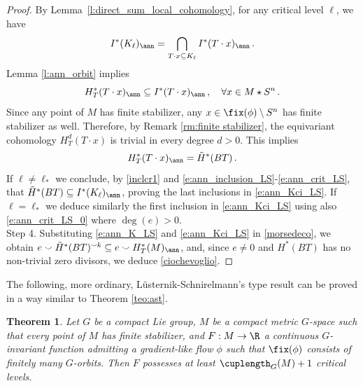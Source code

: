\documentclass[11pt,a4paper,reqno]{article}
\numberwithin{equation}{section}
\newtheorem{theorem}{Theorem}[section]
\theoremstyle{definition}
\begin{document}
\begin{proof}
\noindent
By Lemma~\ref{l:direct_sum_local_cohomology},
for any critical level $ \ell $, we have
\begin{equation}
\label{inclcr1}
I^*(K_\ell)_{\ann} = 
\bigcap_{T\cdot x\subseteq K_\ell}
I^*(T\cdot x)_\ann \,.
\end{equation} 
Lemma \ref{l:ann_orbit} implies 
\begin{equation}
\label{e:ann_inclusion_LS}
H^*_{T}(T\cdot x)_\ann
\subseteq
I^*(T\cdot x)_\ann \, , \quad \forall x \in M \star  S^n   \, .
\end{equation}
Since any point of $M$ has finite stabilizer,  any $x\in\fix(\phi)\setminus S^n$ has finite stabilizer as well. Therefore, by Remark \ref{rm:finite stabilizer},   the equivariant cohomology $H^d_T(T\cdot x)$ is trivial in every degree $d>0$. This implies  
\begin{equation}
\label{e:ann_crit_LS}
H^*_T(T\cdot x)_\ann
=
\tilde H^*(BT) \, . 
\end{equation}
If $ \ell \neq \ell_* $
we conclude, 
by \eqref{inclcr1} and   
\eqref{e:ann_inclusion_LS}-\eqref{e:ann_crit_LS},  that 
$ \tilde H^*(BT)\subseteq I^*(K_{\ell})_\ann $, 
proving  the last inclusions in 
\eqref{e:ann_Kci_LS}.
If $ \ell = \ell_* $ 
we deduce  similarly the first 
inclusion in 
\eqref{e:ann_Kci_LS} using 
also  
\eqref{e:ann_crit_LS_0}
where $ \deg(e) >0 $. 
\\[1mm]
\noindent
{\sc Step 4.}
Substituting \eqref{e:ann_K_LS} and   \eqref{e:ann_Kci_LS} 
in \eqref{morsedeco}, we obtain
$ e\smallsmile \tilde H^*(BT)^{\smallsmile k}
\subseteq 
e\smallsmile H^*_T(M)_\ann $, 
and, since $ e \neq 0 $ and $ H^* (BT)$ has no non-trivial zero divisors, we deduce \eqref{ciochevoglio}. 
\end{proof}






The following, more ordinary,  L\"usternik-Schnirelmann's type  result can be proved in a way similar to Theorem \ref{teo:ast}.
    \begin{theorem}\label{prop:T2G}
        Let $G$ be a compact Lie group, $M$ be a 
        compact metric $G$-space such that every point of $M$ has finite stabilizer, and $F:M\to\R$ a continuous $G$-invariant function admitting a gradient-like flow $\phi$ such that $\fix(\phi)$ consists of finitely many  $G$-orbits. Then $F$ possesses at least $\cuplength_{G}(M)+1$ critical levels.
    \end{theorem}
\end{document}
